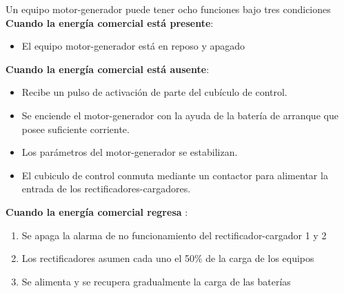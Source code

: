 \documentclass[
	12pt, %
	fleqn, %
	a4paper, %
]{LegrandOrangeBook}
\begin{document}
\begin{example}
Un equipo motor-generador puede tener ocho funciones bajo tres condiciones\\
\textbf{Cuando la energía comercial está presente}:
\begin{itemize}
\item El equipo motor-generador está en reposo y apagado
\end{itemize}
\textbf{Cuando la energía comercial está ausente}:
\begin{itemize}
\item Recibe un pulso de activación de parte del cubículo de control.
\item Se enciende el motor-generador con la ayuda de la batería de arranque que posee
suficiente corriente.
\item Los parámetros del motor-generador se estabilizan.
\item El cubiculo de control conmuta mediante un contactor para alimentar la entrada de los
rectificadores-cargadores.
\end{itemize}
\textbf{Cuando la energía comercial regresa
}:
\begin{enumerate}
\item Se apaga la alarma de no funcionamiento del rectificador-cargador 1 y 2
\item Los rectificadores asumen cada uno el 50\% de la carga de los equipos
\item Se alimenta y se recupera gradualmente la carga de las baterías
\end{enumerate}
\end{example}
\end{document}
